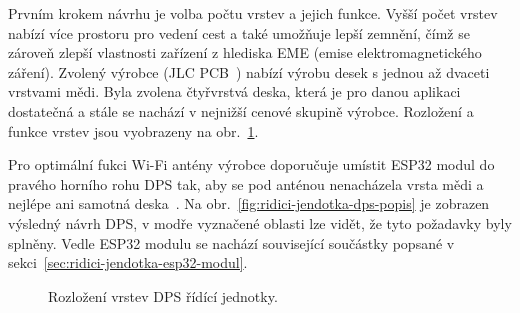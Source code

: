         Prvním krokem návrhu je volba počtu vrstev a jejich funkce. Vyšší počet vrstev nabízí více prostoru pro vedení cest a také umožňuje lepší zemnění, čímž se zároveň zlepší vlastnosti zařízení z hlediska EME (emise elektromagnetického záření). Zvolený výrobce (JLC PCB~\cite{jlcpcb}) nabízí výrobu desek s jednou až dvaceti vrstvami mědi. Byla zvolena čtyřvrstvá deska, která je pro danou aplikaci dostatečná a stále se nachází v nejnižší cenové skupině výrobce. Rozložení a funkce vrstev jsou vyobrazeny na obr.~\ref{fig:ridici-jednotka-stackup-dps}.

        Pro optimální fukci Wi-Fi antény výrobce doporučuje umístit ESP32 modul do pravého horního rohu DPS tak, aby se pod anténou nenacházela vrsta mědi a nejlépe ani samotná deska~\cite{esp32-hw-guidelines}. Na obr.~\ref{fig:ridici-jendotka-dps-popis} je zobrazen výsledný návrh DPS, v modře vyznačené oblasti lze vidět, že tyto požadavky byly splněny. Vedle ESP32 modulu se nachází související součástky popsané v sekci~\ref{sec:ridici-jendotka-esp32-modul}.

        \begin{figure}[h!]
            \centering
            \caption{Rozložení vrstev DPS řídící jednotky.}
            \label{fig:ridici-jednotka-stackup-dps}
        \end{figure}



